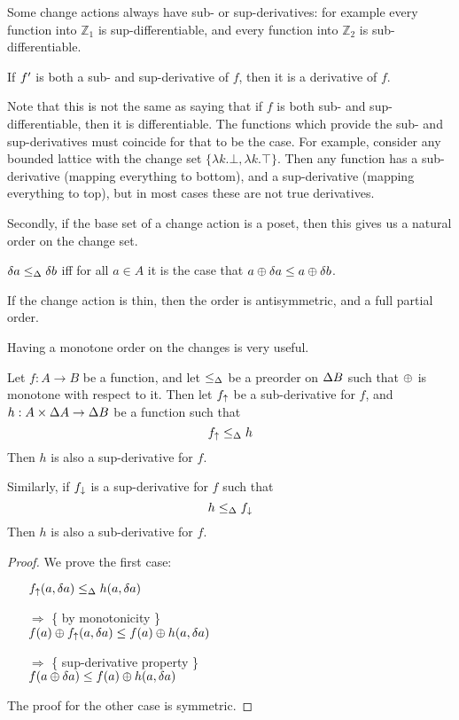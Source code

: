 Some change actions always have sub- or sup-derivatives: for example every function
into $\mathbb{Z}_1$ is sup-differentiable, and every function into $\mathbb{Z}_2$ is 
sub-differentiable.

\begin{prop}
  If $f'$ is both a sub- and sup-derivative of $f$, then it is a derivative of $f$.
\end{prop}

Note that this is not the same as saying that if $f$ is both sub- and
sup-differentiable, then it is differentiable. The functions which provide the
sub- and sup-derivatives must coincide for that to be the case. For example,
consider any bounded lattice with the change set $\{ \lambda k . \bot, \lambda k
 . \top \}$. Then any function has a sub-derivative (mapping everything to
 bottom), and a sup-derivative (mapping everything to top), but in most cases
 these are not true derivatives.

Secondly, if the base set of a change action is a poset, then this gives us a natural
order on the change set.

\begin{defn}
  $\delta a \leq_\Delta \delta b$ iff for all $a \in A$ it is the case that $a \oplus \delta a \leq a \oplus \delta b$.
\end{defn}

If the change action is thin, then the order is antisymmetric, and a
full partial order.

Having a monotone order on the changes is very useful.

\begin{thm}
  Let $f: A \rightarrow B$ be a function, and let $\leq_\Delta$ be a preorder on $\Delta B$ such that $\oplus$ is monotone with
  respect to it. Then let $f_\uparrow$ be a sub-derivative for $f$, and $h: A \times
  \Delta A \rightarrow \Delta B$ be a function such that
  $$f_\uparrow \leq_\Delta h$$
  Then $h$ is also a sup-derivative for $f$.

  Similarly, if $f_\downarrow$ is a sup-derivative for $f$ such that 
  $$h \leq_\Delta f_\downarrow$$
  Then $h$ is also a sub-derivative for $f$.
\end{thm}
\begin{proof}
  We prove the first case:
  \begin{itemize}
    \item[ ]$f_\uparrow(a, \delta a) \leq_\Delta h(a, \delta a)$
    \item[$\Rightarrow$]\{ by monotonicity \}\\
      $f(a) \oplus f_\uparrow(a, \delta a) \leq f(a) \oplus h(a, \delta a)$
    \item[$\Rightarrow$]\{ sup-derivative property \}\\
      $f(a \oplus \delta a) \leq f(a) \oplus h(a, \delta a)$
  \end{itemize}

  The proof for the other case is symmetric.
\end{proof}


